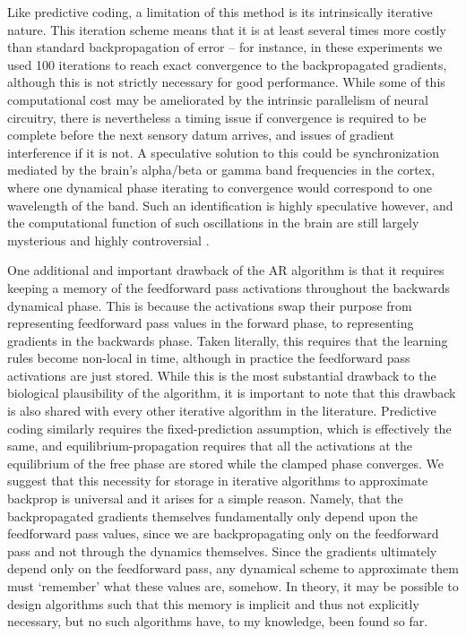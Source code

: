 Like predictive coding, a limitation of this method is its intrinsically iterative nature. This iteration scheme means that it is at least several times more costly than standard backpropagation of error -- for instance, in these experiments we used 100 iterations to reach exact convergence to the backpropagated gradients, although this is not strictly necessary for good performance. While some of this computational cost may be ameliorated by the intrinsic parallelism of neural circuitry, there is nevertheless a timing issue if convergence is required to be complete before the next sensory datum arrives, and issues of gradient interference if it is not. A speculative solution to this could be synchronization mediated by the brain's alpha/beta or gamma band frequencies in the cortex, where one dynamical phase iterating to convergence would correspond to one wavelength of the band. Such an identification is highly speculative however, and the computational function of such oscillations in the brain are still largely mysterious and highly controversial \citep{buzsaki2006rhythms}.

One additional and important drawback of the AR algorithm is that it requires keeping a memory of the feedforward pass activations throughout the backwards dynamical phase. This is because the activations swap their purpose from representing feedforward pass values in the forward phase, to representing gradients in the backwards phase. Taken literally, this requires that the learning rules become non-local in time, although in practice the feedforward pass activations are just stored. While this is the most substantial drawback to the biological plausibility of the algorithm, it is important to note that this drawback is also shared with every other iterative algorithm in the literature. Predictive coding similarly requires the fixed-prediction assumption, which is effectively the same, and equilibrium-propagation requires that all the activations at the equilibrium of the free phase are stored while the clamped phase converges. We suggest that this necessity for storage in iterative algorithms to approximate backprop is universal and it arises for a simple reason. Namely, that the backpropagated gradients themselves fundamentally only depend upon the feedforward pass values, since we are backpropagating only on the feedforward pass and not through the dynamics themselves. Since the gradients ultimately depend only on the feedforward pass, any dynamical scheme to approximate them must `remember' what these values are, somehow. In theory, it may be possible to design algorithms such that this memory is implicit and thus not explicitly necessary, but no such algorithms have, to my knowledge, been found so far.

